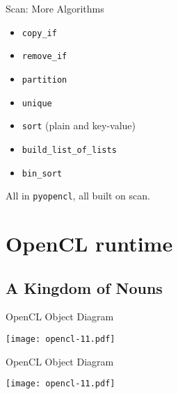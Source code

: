 \documentclass[english,compress]{beamer}
\begin{document}
\begin{frame}{Scan: More Algorithms}
  \begin{itemize}
    \item \texttt{copy\_if}
    \item \texttt{remove\_if}
    \item \texttt{partition}
    \item \texttt{unique}
    \item \texttt{sort} (plain and key-value)
    \item \texttt{build\_list\_of\_lists}
    \item \texttt{bin\_sort}
  \end{itemize}
  All in \texttt{pyopencl}, all built on scan.
\end{frame}

\appendix
\section[Runtime]{OpenCL runtime}
\subsection{A Kingdom of Nouns}
\begin{frame}{OpenCL Object Diagram}
  \begin{center}
  \texttt{[image: opencl-11.pdf]}
  \end{center}
\end{frame}












\begin{frame}{OpenCL Object Diagram}
  \begin{center}
  \texttt{[image: opencl-11.pdf]}
  \end{center}
\end{frame}
\end{document}
